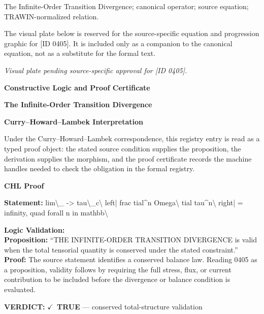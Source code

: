 The Infinite-Order Transition Divergence; canonical operator; source equation; TRAWIN-normalized relation.
\endgroup

\begingroup\footnotesize\sloppy
The visual plate below is reserved for the source-specific equation and progression graphic for [ID 0405]. It is included only as a companion to the canonical equation, not as a substitute for the formal text.
\par\endgroup
\begingroup\footnotesize\itshape
Visual plate pending source-specific approval for [ID 0405].
\par\endgroup

\clearpage
\begingroup\tzpsupportsetup
\noindent\textbf{\fontsize{10.8pt}{12.8pt}\selectfont [ID 0405] Constructive Logic and Proof Certificate}\par
\noindent\textbf{\fontsize{10pt}{12pt}\selectfont The Infinite-Order Transition Divergence}\par
\vspace{0.45em}
\begingroup
\footnotesize
\setlength{\parskip}{0.22em}
\setlength{\parindent}{0pt}
\noindent\textbf{Curry--Howard--Lambek Interpretation}\par
Under the Curry--Howard--Lambek correspondence, this registry entry is read as a typed proof
object: the stated source condition supplies the proposition, the derivation supplies the
morphism, and the proof certificate records the machine handles needed to check the obligation
in the formal registry.

\vspace{0.45em}
\noindent\textbf{CHL Proof}\par
\textbf{Statement:} lim\textbackslash{}\_ -> tau\textbackslash{}\_c\textbackslash{} left| frac tial\textasciicircum{}n Omega\textbackslash{} tial tau\textasciicircum{}n\textbackslash{} right| = infinity, quad forall n
in mathbb\textbackslash{}

\textbf{Logic Validation:}\\
\textbf{Proposition:} ``THE INFINITE-ORDER TRANSITION DIVERGENCE is valid when the total tensorial quantity is
conserved under the stated constraint.''\\
\textbf{Proof:} The source statement identifies a conserved balance law. Reading 0405 as a proposition,
validity follows by requiring the full stress, flux, or current contribution to be
included before the divergence or balance condition is evaluated.

\textbf{VERDICT:} \ensuremath{\checkmark}\ \textbf{TRUE} --- conserved total-structure validation

